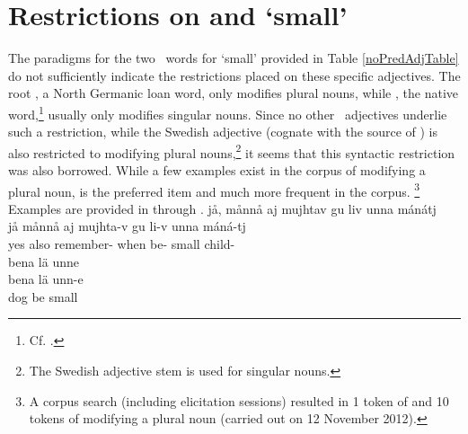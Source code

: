 \section{Restrictions on  and  ‘small’}\label{smallADJs}
The paradigms for the two \PS\ words for ‘small’ provided in Table \vref{noPredAdjTable} do not sufficiently indicate the restrictions placed on these specific adjectives. The root , a North Germanic loan word, only modifies plural nouns, while \mbox{,} %
the native word,\footnote{Cf. \citet[265]{Sammallahti1998}.} usually only modifies singular nouns. 
Since no other \PS\ adjectives underlie such a restriction, while the Swedish adjective  (cognate with the source of ) is also restricted to modifying plural nouns,\footnote{The Swedish adjective stem  is used for singular nouns.} 
it seems that this syntactic restriction was also borrowed. While a few examples exist in the corpus of  modifying a plural noun,  is the preferred item and much more frequent in the corpus.%
\footnote{A corpus search (including elicitation sessions) resulted in 1 token of  and 10 tokens of  modifying a plural noun (carried out on 12 November 2012).} 
Examples are provided in  through .
\ea\label{smallADJex1}
\glll	jå, månnå aj mujhtav gu liv unna mánátj\\
	jå månnå aj mujhta-v gu li-v unna máná-tj\\
	yes  also remember- when be- small child-\BS{}\\\nopagebreak
{}	
\z
\ea\label{smallADJex2}
\glll	bena lä unne\\
	bena lä unn-e\\
	dog\BS{} be\BS{} small\BS{}\\\nopagebreak
